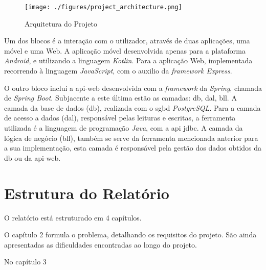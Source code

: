 \begin{figure}[H]
	\centering
	\texttt{[image: ./figures/project\_architecture.png]}
	\caption{Arquitetura do Projeto}
	\label{project-architecture}
\end{figure}

Um dos blocos é a interação com o utilizador, através de duas aplicações, uma móvel e uma Web. A aplicação móvel desenvolvida apenas para a plataforma \textit{Android}, e utilizando a linguagem \textit{Kotlin}. Para a aplicação Web, implementada recorrendo à linguagem \textit{JavaScript}, com o auxilio da \textit{framework Express}. 

O outro bloco incluí a \gls{api-web} desenvolvida com a \textit{framework} da \textit{Spring}, chamada de \textit{Spring Boot}. Subjacente a este última estão as camadas: \acrfull{db}, \acrfull{dal}, \acrfull{bll}.  A camada da base de dados (\acrshort{db}), realizada com o \acrfull{sgbd} \textit{PostgreSQL}. Para a camada de acesso a dados (\acrshort{dal}), responsável pelas leituras e escritas, a ferramenta utilizada é a linguagem de programação \textit{Java}, com a \gls{api} \acrfull{jdbc}. A camada da lógica de negócio (\acrshort{bll}), também se serve da ferramenta mencionada anterior para a sua implementação, esta camada é responsável pela gestão dos dados obtidos da \acrshort{db} ou da \gls{api-web}.


%
%
\section{Estrutura do Relatório} \label{sec14}
O relatório está estruturado em 4 capítulos.

O capítulo 2 formula o problema, detalhando os requisitos do projeto. São ainda apresentadas as dificuldades encontradas ao longo do projeto. 

No capítulo 3 
